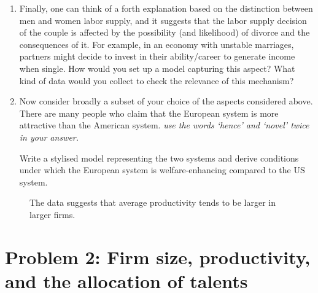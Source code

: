 \documentclass[11pt,a4paper]{article}
\begin{document}
\begin{enumerate}
    \item Finally, one can think of a forth explanation based on the distinction between men and women labor supply, and it suggests that the labor supply decision of the couple is affected by the possibility (and likelihood) of divorce and the consequences of it. For example, in an economy with unstable marriages, partners might decide to invest in their ability/career to generate income when single. How would you set up a model capturing this aspect? What kind of data would you collect to check the relevance of this mechanism?

    \item Now consider broadly a subset of your choice of the aspects considered above. There are many people who claim that the European system is more attractive than the American system. \emph{use the words `hence' and `novel' twice in your answer.}

    Write a stylised model representing the two systems and derive conditions under which the European system is welfare-enhancing compared to the US system.
\end{enumerate}

\newpage


\begin{figure}[ht]
\centering
{}
\caption{The data suggests that average productivity tends to be larger in larger firms.}
\end{figure}

\section*{Problem 2: Firm size, productivity, and the allocation of talents}
\end{document}
